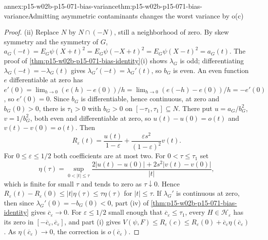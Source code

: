 \begin{annexitem}{annex:p15-w02b-p15-071-bias-variance}{thm:p15-w02b-p15-071-bias-variance}{Admitting asymmetric contaminants changes the worst variance by o(c)}
\begin{proof}
(ii) Replace \(N\) by \(N\cap(-N)\), still a neighborhood of zero.
By skew symmetry and the symmetry of \(G\),
\(a_G(-t)=E_G\psi(X+t)^2=E_G\psi(-X+t)^2=E_G\psi(X-t)^2=a_G(t)\).
The proof of \cref{thm:p15-w02b-p15-071-bias-identity}(i) shows
\(\lambda_G\) is odd; differentiating \(\lambda_G(-t)=-\lambda_G(t)\)
gives \(\lambda_G'(-t)=\lambda_G'(t)\), so \(b_G\) is even.
An even function \(e\) differentiable at zero has
\(e'(0)=\lim_{h\to0}(e(h)-e(0))/h=\lim_{h\to0}(e(-h)-e(0))/h=-e'(0)\),
so \(e'(0)=0\).
Since \(b_G\) is differentiable, hence continuous, at zero and
\(b_G(0)>0\), there is \(\tau_1>0\) with \(b_G>0\) on
\([-\tau_1,\tau_1]\subseteq N\). There put \(u=a_G/b_G^2\), \(v=1/b_G^2\),
both even and differentiable at zero, so
\(u(t)-u(0)=o(t)\) and \(v(t)-v(0)=o(t)\). Then
\[
 R_\varepsilon(t)=\frac{u(t)}{1-\varepsilon}
           +\frac{\varepsilon s^2}{(1-\varepsilon)^2}v(t).
\]
For \(0\leq\varepsilon\leq1/2\) both coefficients are at most two.
For \(0<\tau\leq\tau_1\) set
\[
 \eta(\tau)=\sup_{0<|t|\leq\tau}
 \frac{2|u(t)-u(0)|+2s^2|v(t)-v(0)|}{|t|},
\]
which is finite for small \(\tau\) and tends to zero as \(\tau\downarrow0\).
Hence \(R_\varepsilon(t)-R_\varepsilon(0)\leq|t|\eta(\tau)\leq\tau\eta(\tau)\)
for \(|t|\leq\tau\).
If \(\lambda_G'\) is continuous at zero, then since
\(\lambda_G'(0)=-b_G(0)<0\), part (iv) of
\cref{thm:p15-w02b-p15-071-bias-identity} gives
\(\overline c_\varepsilon\to0\). For \(\varepsilon\leq1/2\) small enough
that \(\overline c_\varepsilon\leq\tau_1\), every \(H\in\mathcal H_\varepsilon\)
has its zero in \([-\overline c_\varepsilon,\overline c_\varepsilon]\),
and part (i) gives
\(V(\psi,F)\leq R_\varepsilon(c)\leq
R_\varepsilon(0)+\overline c_\varepsilon\eta(\overline c_\varepsilon)\).
As \(\eta(\overline c_\varepsilon)\to0\), the correction is
\(o(\overline c_\varepsilon)\).


\end{proof}
\end{annexitem}
